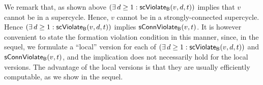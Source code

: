 We remark that, as shown above $(\exists\, d \ge 1: \mathsf{scViolate}_{\mathsf{B}}(v,d,t))$
implies that $v$ cannot be in a supercycle. Hence, $v$ cannot be in a strongly-connected supercycle. 
Hence $(\exists\, d \ge 1: \mathsf{scViolate}_{\mathsf{B}}(v,d,t))$ implies $\mathsf{sConnViolate}_{\mathsf{B}}(v,t)$. It is however convenient to state the formation
violation condition in this manner, since, in the sequel, we formulate a ``local'' version for each of  
$(\exists\, d \ge 1: \mathsf{scViolate}_{\mathsf{B}}(v,d,t))$ and $\mathsf{sConnViolate}_{\mathsf{B}}(v,t)$, and the implication does not necessarily hold for the local
versions. The advantage of the local versions is that they are usually efficiently computable, as we show in the sequel.
